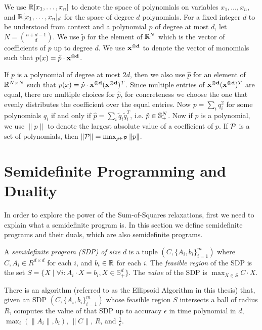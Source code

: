 We use $\mathbb R[x_1,\dots,x_n]$ to denote the space of polynomials on variables $x_1,\dots,x_n$, and $\mathbb R[x_1,\dots,x_n]_d$ for the space of degree $d$ polynomials.
For a fixed integer $d$ to be understood from context and a polynomial $p$ of degree at most $d$, let $N = \binom{n+d-1}{d}$. We use $\tilde{p}$ for the element of $\mathbb R^{N}$ which is the vector of coefficients of $p$ up to degree $d$. We use $\mathbf{x^{\otimes d}}$ to denote the vector of monomials such that $p(x) = \tilde{p} \cdot \mathbf{x^{\otimes d}}$.

If $p$ is a polynomial of degree at most $2d$, then we also use $\hat{p}$ for an element of $\mathbb R^{N \times N}$ such that $p(x) = \hat{p} \cdot \mathbf{x^{\otimes d}}(\mathbf{x^{\otimes d}})^T$. Since multiple entries of $\mathbf{x^{\otimes d}}(\mathbf{x^{\otimes d}})^T$ are equal, there are multiple choices for $\hat{p}$, for concreteness we choose the one that evenly distributes the coefficient over the equal entries. Now $p = \sum_i q_i^2$ for some polynomials $q_i$ if and only if $\hat{p} = \sum_i \tilde{q}_i\tilde{q}_i^T$, i.e. $\hat{p} \in \mathbb{S}^{N}_+$. Now if $p$ is a polynomial, we use $\|p\|$ to denote the largest absolute value of a coefficient of $p$. If $\mathcal P$ is a set of polynomials, then $\|\mathcal P\| = \max_{p \in \mathcal P} \|p\|$.

\section{Semidefinite Programming and Duality}
In order to explore the power of the Sum-of-Squares relaxations, first we need to explain what a semidefinite program is.
In this section we define semidefinite programs and their duals, which are also semidefinite programs.

\begin{definition}
A \emph{semidefinite program (SDP) of size $d$} is a tuple $(C,\{A_i, b_i\}_{i=1}^m)$ where $C,A_i \in R^{d \times d}$ for each $i$, and $b_i \in \mathbb R$ for each $i$.
The \emph{feasible region} of the SDP is the set $S = \{X \mid \forall i: A_i \cdot X = b_i, X \in \mathbb{S}_+^d\}$.
The \emph{value} of the SDP is $\max_{X\in S} C \cdot X$.
\end{definition}
\begin{fact}
There is an algorithm (referred to as the Ellipsoid Algorithm in this thesis) that, given an SDP $(C, \{A_i,b_i\}_{i=1}^m)$ whose feasible region $S$ intersects a ball of radius $R$, computes the value of that SDP up to accuracy $\epsilon$ in time polynomial in $d$, $\max_i\left(\|A_i\|,b_i\right)$, $\|C\|$, $R$, and $\frac{1}{\epsilon}$.
\end{fact}

